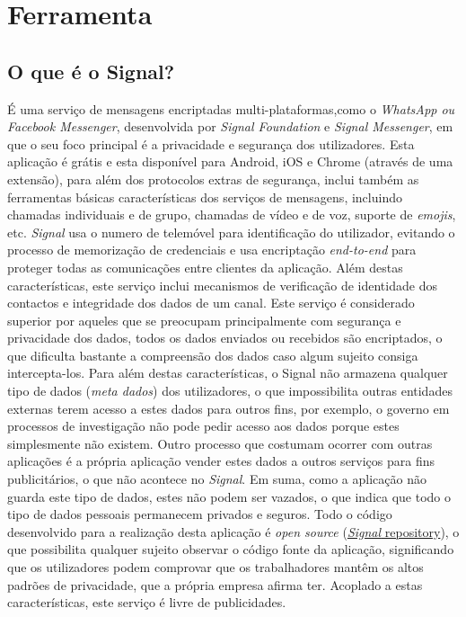 \section{Ferramenta}

\vspace{-0.1cm}
\subsection{O que é o Signal?}
\label{sec:signal}

É uma serviço de mensagens encriptadas multi-plataformas,como o \textit{WhatsApp ou Facebook Messenger}, desenvolvida por \textit{Signal Foundation} e \textit{Signal Messenger}, em que o seu foco principal é a privacidade e segurança dos utilizadores.
Esta aplicação é grátis e esta disponível para  Android, iOS e Chrome (através de uma extensão),
para além dos protocolos extras de segurança, inclui também as ferramentas básicas características dos serviços de mensagens, incluindo chamadas individuais e de grupo, chamadas de vídeo e de voz, suporte de \textit{emojis}, etc.\newline
\textit{Signal} usa o numero de telemóvel para identificação do utilizador, evitando o processo de memorização de credenciais e usa encriptação \textit{end-to-end} para proteger todas as comunicações entre clientes da aplicação.\newline
Além destas características, este serviço inclui mecanismos de verificação de identidade dos contactos e integridade dos dados de um canal.\newline
Este serviço é considerado superior por aqueles que se preocupam principalmente com segurança e privacidade dos dados, todos os dados enviados ou recebidos são encriptados, o que dificulta bastante a compreensão dos dados caso algum sujeito consiga intercepta-los.
Para além destas características, o Signal não armazena qualquer tipo de dados (\textit{meta dados}) dos utilizadores, o que impossibilita outras entidades externas terem acesso a estes dados para outros fins, por exemplo, o governo em processos de investigação não pode pedir acesso aos dados porque estes simplesmente não existem. Outro processo que costumam ocorrer com outras aplicações é a própria aplicação vender estes dados a outros serviços para fins publicitários, o que não acontece no \textit{Signal}. Em suma, como a aplicação não guarda este tipo de dados, estes não podem ser vazados, o que indica que todo o tipo de dados pessoais permanecem privados e seguros.\newline
Todo o código desenvolvido para a realização desta aplicação é \textit{open source} (\hyperlink{https://github.com/signalapp}{\textit{Signal} repository}), o que possibilita qualquer sujeito observar o código fonte da aplicação, significando que os utilizadores podem comprovar que os trabalhadores mantêm os altos padrões de privacidade, que a própria empresa afirma ter. Acoplado a estas características, este serviço é livre de publicidades. \cite{signal_wikipedia} \cite{signal_popular}

